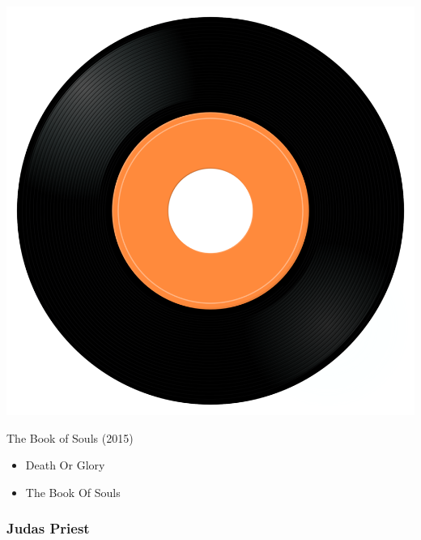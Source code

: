 \begin{minipage}[t]{0.25\textwidth}
\captionsetup{type=figure}
\includegraphics[width=\textwidth]{Images/cover.png}
\caption*{The Book of Souls (2015)}
\end{minipage}
\begin{minipage}[t]{0.25\textwidth}\vspace{0pt}
\begin{itemize}[nosep,leftmargin=1em,labelwidth=*,align=left]
	\setlength{\itemsep}{0pt}
	\item Death Or Glory
	\item The Book Of Souls
\end{itemize}
\end{minipage}

\subsubsection{Judas Priest}

